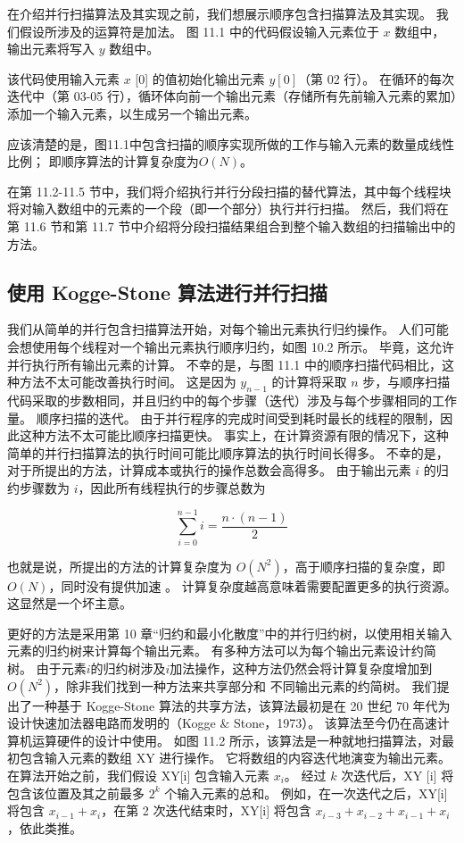 在介绍并行扫描算法及其实现之前，我们想展示顺序包含扫描算法及其实现。 我们假设所涉及的运算符是加法。 图 11.1 中的代码假设输入元素位于 $x$ 数组中，输出元素将写入 $y$ 数组中。

该代码使用输入元素 $x$ [0] 的值初始化输出元素 $y[0]$（第 02 行）。 在循环的每次迭代中（第 03-05 行），循环体向前一个输出元素（存储所有先前输入元素的累加）添加一个输入元素，以生成另一个输出元素。

应该清楚的是，图11.1中包含扫描的顺序实现所做的工作与输入元素的数量成线性比例； 即顺序算法的计算复杂度为$O(N)$。

在第 11.2-11.5 节中，我们将介绍执行并行分段扫描的替代算法，其中每个线程块将对输入数组中的元素的一个段（即一个部分）执行并行扫描。 然后，我们将在第 11.6 节和第 11.7 节中介绍将分段扫描结果组合到整个输入数组的扫描输出中的方法。

\subsection{使用 Kogge-Stone 算法进行并行扫描}
我们从简单的并行包含扫描算法开始，对每个输出元素执行归约操作。 人们可能会想使用每个线程对一个输出元素执行顺序归约，如图 10.2 所示。 毕竟，这允许并行执行所有输出元素的计算。 不幸的是，与图 11.1 中的顺序扫描代码相比，这种方法不太可能改善执行时间。 这是因为 $y_{n-1}$ 的计算将采取 $n$ 步，与顺序扫描代码采取的步数相同，并且归约中的每个步骤（迭代）涉及与每个步骤相同的工作量。 顺序扫描的迭代。 由于并行程序的完成时间受到耗时最长的线程的限制，因此这种方法不太可能比顺序扫描更快。 事实上，在计算资源有限的情况下，这种简单的并行扫描算法的执行时间可能比顺序算法的执行时间长得多。 不幸的是，对于所提出的方法，计算成本或执行的操作总数会高得多。 由于输出元素 $i$ 的归约步骤数为 $i$，因此所有线程执行的步骤总数为

$$
\sum_{i=0}^{n-1} i=\frac{n \cdot(n-1)}{2}
$$

也就是说，所提出的方法的计算复杂度为 $O\left(N^{2}\right)$，高于顺序扫描的复杂度，即 $O(N)$，同时没有提供加速 。 计算复杂度越高意味着需要配置更多的执行资源。 这显然是一个坏主意。

更好的方法是采用第 10 章“归约和最小化散度”中的并行归约树，以使用相关输入元素的归约树来计算每个输出元素。 有多种方法可以为每个输出元素设计约简树。 由于元素$i$的归约树涉及$i$加法操作，这种方法仍然会将计算复杂度增加到$O\left(N^{2}\right)$，除非我们找到一种方法来共享部分和 不同输出元素的约简树。 我们提出了一种基于 Kogge-Stone 算法的共享方法，该算法最初是在 20 世纪 70 年代为设计快速加法器电路而发明的（Kogge \& Stone，1973）。 该算法至今仍在高速计算机运算硬件的设计中使用。 如图 11.2 所示，该算法是一种就地扫描算法，对最初包含输入元素的数组 XY 进行操作。 它将数组的内容迭代地演变为输出元素。 在算法开始之前，我们假设 XY[i] 包含输入元素 $x_{i}$。 经过 $k$ 次迭代后，$\mathrm{XY}$ [i] 将包含该位置及其之前最多 $2^{k}$ 个输入元素的总和。 例如，在一次迭代之后，XY[i] 将包含 $x_{i-1}+x_{i}$，在第 2 次迭代结束时，XY[i] 将包含 $x_{i-3}+x_{ i-2}+x_{i-1}+x_{i}$，依此类推。

